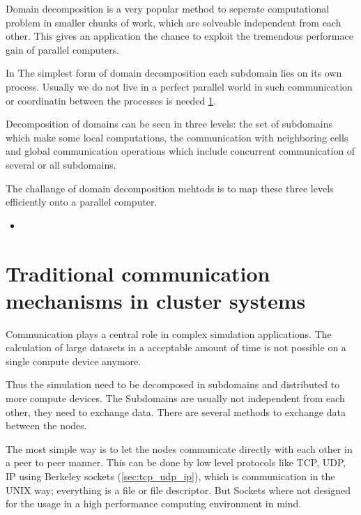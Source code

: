 Domain decomposition is a very popular method to seperate
computational problem in smaller chunks of work, which are solveable
independent from each other. This gives an application the chance to
exploit the tremendous performace gain of parallel computers.

In The simplest form of domain decomposition each subdomain lies on
its own process. Usually we do not live in a perfect parallel world in
such communication or coordinatin between the processes is needed
\ref{sec:communication}.

Decomposition of domains can be seen in three levels: the set of
subdomains which make some local computations, the communication with
neighboring cells and global communication operations which include
concurrent communication of several or all subdomains.

The challange of domain decomposition mehtods is to map these three
levels efficiently onto a parallel computer.

\begin{itemize}
\item 
\end{itemize}


\section{Traditional communication mechanisms in cluster systems}
\label{sec:communication}
Communication plays a central role in complex simulation
applications. The calculation of large datasets in a
acceptable amount of time is not possible on a single compute
device anymore.

 Thus the simulation need to be decomposed in
subdomains and distributed to more compute devices.  The Subdomains
are usually not independent from each other, they need to exchange
data. There are several methods to exchange data between the nodes.

The most simple way is to let the nodes communicate directly with each
other in a peer to peer manner.  This can be done by low level protocols like TCP, UDP, IP
using Berkeley sockets (\ref{sec:tcp_udp_ip}), which is communication
in the UNIX way; everything is a file or file descriptor. But Sockets
where not designed for the usage in a high performance computing
environment in mind.

